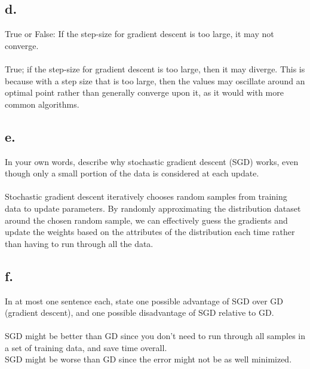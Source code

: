 \documentclass{article}
\newcommand{\1}{\mathbf{1}}
\begin{document}
{\subsection*{d.}

True or False: If the step-size for gradient descent is too large, it may not converge. \\ \\

True; if the step-size for gradient descent is too large, then it may diverge. This is because with a step size that is too large, then the values may oscillate around an optimal point rather than generally converge upon it, as it would with more common algorithms.

\subsection*{e.}

In your own words, describe why stochastic gradient descent (SGD) works, even though only a small portion of the data is considered at each update. \\ \\

Stochastic gradient descent iteratively chooses random samples from training data to update parameters. By randomly approximating the distribution dataset around the chosen random sample, we can effectively guess the gradients and update the weights based on the attributes of the distribution each time rather than having to run through all the data.

\subsection*{f.}

In at most one sentence each, state one possible advantage of SGD over GD (gradient descent), and one possible disadvantage of SGD relative to GD. \\ \\

SGD might be better than GD since you don't need to run through all samples in a set of training data, and save time overall. \\ 
SGD might be worse than GD since the error might not be as well minimized.\\

}
\end{document}
